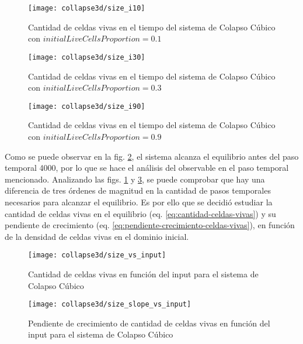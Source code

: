 \begin{figure}[H]
    \centering
    \texttt{[image: collapse3d/size\_i10]}
    \caption{Cantidad de celdas vivas en el tiempo del sistema de Colapso Cúbico con $initialLiveCellsProportion = 0.1$}
    \label{fig:colapso3d_i10}
\end{figure}
\begin{figure}[H]
    \centering
    \texttt{[image: collapse3d/size\_i30]}
    \caption{Cantidad de celdas vivas en el tiempo del sistema de Colapso Cúbico con $initialLiveCellsProportion = 0.3$}
    \label{fig:colapso3d_i30}
\end{figure}
\begin{figure}[H]
    \centering
    \texttt{[image: collapse3d/size\_i90]}
    \caption{Cantidad de celdas vivas en el tiempo del sistema de Colapso Cúbico con $initialLiveCellsProportion = 0.9$}
    \label{fig:colapso3d_i90}
\end{figure}

Como se puede observar en la fig. \ref{fig:colapso3d_i30}, el sistema alcanza el equilibrio
antes del paso temporal 4000, por lo que se hace el análisis del observable en el paso temporal mencionado.
Analizando las figs. \ref{fig:colapso3d_i10} y \ref{fig:colapso3d_i90}, se
puede comprobar que hay una diferencia de tres órdenes de magnitud en la cantidad de pasos temporales necesarios para
alcanzar el equilibrio.
Es por ello que se decidió estudiar la cantidad de celdas vivas en el equilibrio (eq. \ref{eq:cantidad-celdas-vivas})
y su pendiente de crecimiento (eq. \ref{eq:pendiente-crecimiento-celdas-vivas}),
en función de la densidad de celdas vivas en el dominio inicial.

\begin{figure}[H]
    \centering
    \texttt{[image: collapse3d/size\_vs\_input]}
    \caption{Cantidad de celdas vivas en función del input para el sistema de Colapso Cúbico}
    \label{fig:colapso3d_size_vs_input}
\end{figure}
\begin{figure}[H]
    \centering
    \texttt{[image: collapse3d/size\_slope\_vs\_input]}
    \caption{Pendiente de crecimiento de cantidad de celdas vivas en función del input para el sistema de Colapso Cúbico}
    \label{fig:colapso3d_size_slope_vs_input}
\end{figure}

